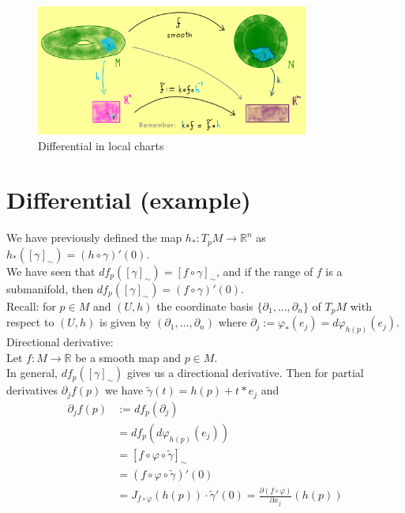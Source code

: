 \documentclass[11pt]{book} %
\begin{document}
\begin{figure}[H]
    \centering
    \includegraphics[width=0.8\textwidth]{Figs/differential_in_local_charts.jpeg}
    \caption{Differential in local charts}
\end{figure}



\section{Differential (example)}

We have previously defined the map $h_* : T_pM \to \mathbb{R}^n$ as $h_*([\gamma]_{\sim}) = (h \circ \gamma)'(0)$. \\
We have seen that $df_p([\gamma]_{\sim}) = [f \circ \gamma]_{\sim}$, and if the range of $f$ is a submanifold, then $df_p([\gamma]_{\sim}) = (f \circ \gamma)'(0)$. \\


Recall: for \( p \in M \) and $(U, h)$ the coordinate basis $\{ \partial_1, \ldots, \partial_n \}$ of $T_pM$ with respect to $(U, h)$
is given by $(\partial_1, \ldots, \partial_n)$ where $\partial_j := \varphi_*(e_j) = d\varphi_{h(p)}(e_j)$. \\ 

Directional derivative: \\
Let $f : M \to \mathbb{R}$ be a smooth map and $p \in M$. \\
In general, $df_p([\gamma]_{\sim})$ gives us a directional derivative. Then for partial derivatives $\partial_j f(p)$ we have $\tilde{\gamma}(t) = h(p) + t * e_j$ and \\
\begin{align*}
    \partial_j f(p) &:= df_p(\partial_j) \\
    &= df_p(d\varphi_{h(p)}(e_j)) \\
    &= [f \circ \varphi \circ \tilde{\gamma}]_{\sim} \\
    &= (f \circ \varphi \circ \tilde{\gamma})'(0) \\
    &= J_{f \circ \varphi}(h(p)) \cdot \tilde{\gamma}'(0) = \frac{\partial (f \circ \varphi)}{\partial x_j}(h(p))
\end{align*}
\end{document}
